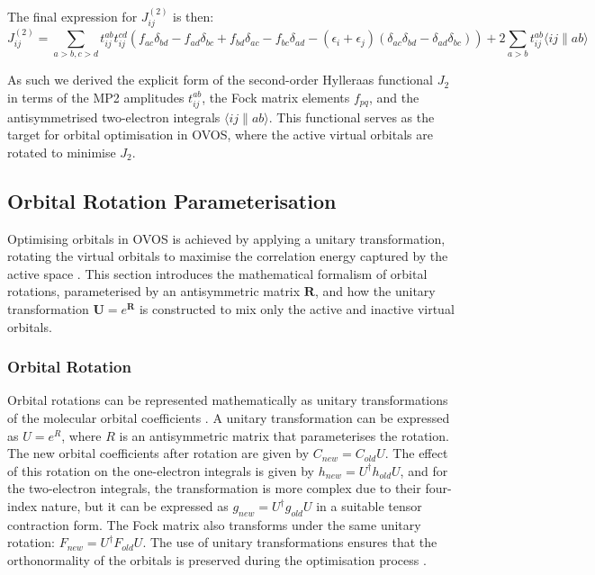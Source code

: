 The final expression for $J_{ij}^{(2)}$ is then:
\begin{equation}
    J_{ij}^{(2)} = \sum_{a>b,c>d} t_{ij}^{ab} t_{ij}^{cd} (f_{ac}\delta_{bd} - f_{ad}\delta_{bc} + f_{bd}\delta_{ac} - f_{bc}\delta_{ad} - (\epsilon_i + \epsilon_j)(\delta_{ac}\delta_{bd} - \delta_{ad}\delta_{bc})) + 2\sum_{a>b} t_{ij}^{ab} \langle ij\|ab\rangle
\end{equation}


As such we derived the explicit form of the second-order Hylleraas functional $J_2$ in terms of the MP2 amplitudes $t_{ij}^{ab}$, the Fock matrix elements $f_{pq}$, and the antisymmetrised two-electron integrals $\langle ij\|ab\rangle$. This functional serves as the target for orbital optimisation in OVOS, where the active virtual orbitals are rotated to minimise $J_2$.


\subsection{Orbital Rotation Parameterisation}

Optimising orbitals in OVOS is achieved by applying a unitary transformation, rotating the virtual orbitals to maximise the correlation energy captured by the active space \cite{Adamowicz1987}. This section introduces the mathematical formalism of orbital rotations, parameterised by an antisymmetric matrix $\mathbf{R}$, and how the unitary transformation $\mathbf{U} = e^{\mathbf{R}}$ is constructed to mix only the active and inactive virtual orbitals.


\subsubsection{Orbital Rotation}

Orbital rotations can be represented mathematically as unitary transformations of the molecular orbital coefficients \cite{Helgaker2000}. A unitary transformation can be expressed as $U = e^R$, where $R$ is an antisymmetric matrix that parameterises the rotation. The new orbital coefficients after rotation are given by $C_{new} = C_{old} U$. The effect of this rotation on the one-electron integrals is given by $h_{new} = U^\dagger h_{old} U$, and for the two-electron integrals, the transformation is more complex due to their four-index nature, but it can be expressed as $g_{new} = U^\dagger g_{old} U$ in a suitable tensor contraction form. The Fock matrix also transforms under the same unitary rotation: $F_{new} = U^\dagger F_{old} U$. The use of unitary transformations ensures that the orthonormality of the orbitals is preserved during the optimisation process \cite{Helgaker2000}. 

